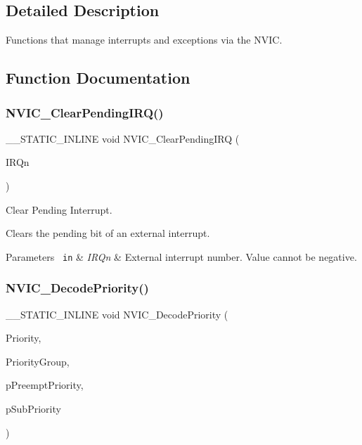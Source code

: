 \subsection{Detailed Description}
Functions that manage interrupts and exceptions via the N\+V\+IC. 



\subsection{Function Documentation}
\mbox{\label{group__CMSIS__Core__NVICFunctions_ga332e10ef9605dc6eb10b9e14511930f8}} 
\subsubsection{\texorpdfstring{NVIC\_ClearPendingIRQ()}{NVIC\_ClearPendingIRQ()}}
{\footnotesize\ttfamily \+\_\+\+\_\+\+S\+T\+A\+T\+I\+C\+\_\+\+I\+N\+L\+I\+NE void N\+V\+I\+C\+\_\+\+Clear\+Pending\+I\+RQ (\begin{DoxyParamCaption}\item[{\mbox{\hyperlink{group__SAME70J19__cmsis_gac3af4a32370fb28c4ade8bf2add80251}{I\+R\+Qn\+\_\+\+Type}}}]{I\+R\+Qn }\end{DoxyParamCaption})}



Clear Pending Interrupt. 

Clears the pending bit of an external interrupt. 
\begin{DoxyParams}[1]{Parameters}
\mbox{\texttt{ in}}  & {\em I\+R\+Qn} & External interrupt number. Value cannot be negative. \\
\hline
\end{DoxyParams}
\mbox{\label{group__CMSIS__Core__NVICFunctions_ga3387607fd8a1a32cccd77d2ac672dd96}} 
\subsubsection{\texorpdfstring{NVIC\_DecodePriority()}{NVIC\_DecodePriority()}}
{\footnotesize\ttfamily \+\_\+\+\_\+\+S\+T\+A\+T\+I\+C\+\_\+\+I\+N\+L\+I\+NE void N\+V\+I\+C\+\_\+\+Decode\+Priority (\begin{DoxyParamCaption}\item[{uint32\+\_\+t}]{Priority,  }\item[{uint32\+\_\+t}]{Priority\+Group,  }\item[{uint32\+\_\+t $\ast$const}]{p\+Preempt\+Priority,  }\item[{uint32\+\_\+t $\ast$const}]{p\+Sub\+Priority }\end{DoxyParamCaption})}



